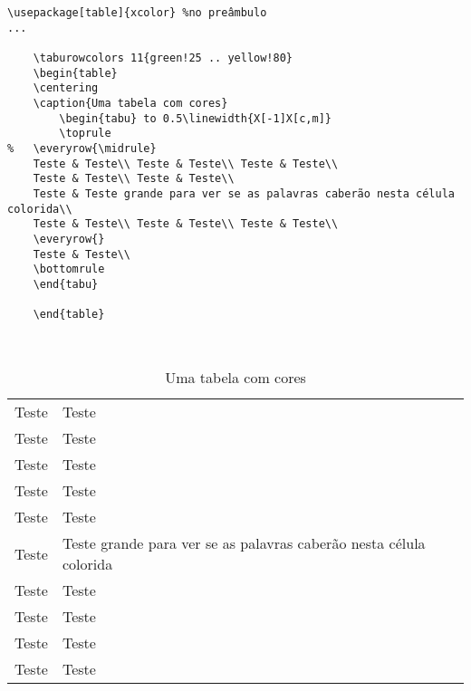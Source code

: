 \documentclass{article}
\begin{document}
\begin{verbatim}
\usepackage[table]{xcolor} %no preâmbulo
...

	\taburowcolors 11{green!25 .. yellow!80}
	\begin{table}
	\centering
	\caption{Uma tabela com cores}
		\begin{tabu} to 0.5\linewidth{X[-1]X[c,m]}
		\toprule
%	\everyrow{\midrule}
	Teste & Teste\\ Teste & Teste\\ Teste & Teste\\
	Teste & Teste\\	Teste & Teste\\
	Teste & Teste grande para ver se as palavras caberão nesta célula colorida\\
	Teste & Teste\\	Teste & Teste\\ Teste & Teste\\
	\everyrow{}
	Teste & Teste\\
	\bottomrule
	\end{tabu}
	
	\end{table}
	


\end{verbatim}

	\begin{table}
	\centering
	\caption{Uma tabela com cores}
		\begin{tabu} to 0.5\linewidth{X[-1]X[c,m]}
		\toprule
	\everyrow{\midrule}
	Teste & Teste\\
		Teste & Teste\\
			Teste & Teste\\
				Teste & Teste\\
					Teste & Teste\\
						Teste & Teste grande para ver se as palavras caberão nesta célula colorida\\
							Teste & Teste\\
								Teste & Teste\\
									Teste & Teste\\
							\everyrow{}
										Teste & Teste\\
	\bottomrule
	\end{tabu}
	
	\end{table}
	
	\taburowcolors{}
\end{document}
